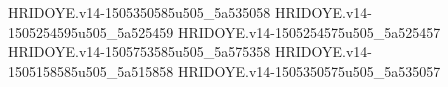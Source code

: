 HRIDOYE.v14-1505350585u505_5a535058
HRIDOYE.v14-1505254595u505_5a525459
HRIDOYE.v14-1505254575u505_5a525457
HRIDOYE.v14-1505753585u505_5a575358
HRIDOYE.v14-1505158585u505_5a515858
HRIDOYE.v14-1505350575u505_5a535057
